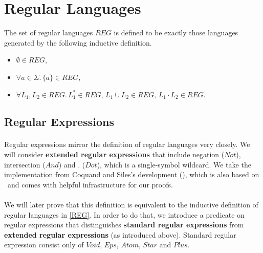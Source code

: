 \documentclass[11pt,a4paper,oneside]{book}
\begin{document}
                



        \section{Regular Languages}
        
    
            \begin{definition}{}
                \label{REG}
            The set of regular languages $REG$ is defined to be exactly those languages generated by the following inductive definition.
            \begin{itemize}
                \item
                    $\emptyset \in REG$, 
                \item
                    $\forall a \in \Sigma. \, \{a\} \in REG$, 
                \item
                    $\forall L_1, L_2 \in REG. \, L_1^* \in REG, \, L_1 \cup L_2 \in REG, \, L_1 \cdot L_2 \in REG$.
            \end{itemize}
            \end{definition}


            \subsection{Regular Expressions}

                \paragraph{} 
                    Regular expressions mirror the definition of regular languages very closely. 
                    We will consider \textbf{extended regular expressions} that include negation ($Not$), intersection ($And$) and $.$ ($Dot$), which is a single-symbol wildcard. 
                    We take the implementation from Coquand and Siles's development (\cite{DBLP:conf/cpp/CoquandS11}), which is also based on \ssreflect\ and comes with helpful infrastructure for our proofs.



                \paragraph{}
                We will later prove that this definition is equivalent to the inductive definition of regular languages in \ref{REG}.
                In order to do that, we introduce a predicate on regular expressions that distinguishes \textbf{standard regular expressions} 
                from \textbf{extended regular expressions} (as introduced above).
                Standard regular expression consist only of $Void$, $Eps$, $Atom$, $Star$ and $Plus$.
\end{document}
